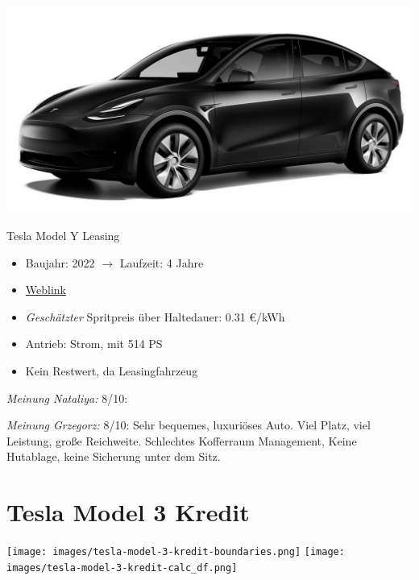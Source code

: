 \documentclass[landscape, DIV=99, 14pt]{scrartcl}
\begin{document}
\pagebreak
\begin{center}
\includegraphics[width=0.9\columnwidth]{cars/tesla-model-y-leasing.jpg}

Tesla Model Y Leasing
\end{center}

\begin{itemize}
    \item Baujahr: 2022 $\rightarrow$ Laufzeit: 4 Jahre
    \item \href{https://www.tesla.com/de_de/modely/design\#overview}{Weblink}
    \item \emph{Gesch\"atzter} Spritpreis \"uber Haltedauer: 0.31 \euro{}/kWh
    \item Antrieb: Strom, mit 514 PS
    \item Kein Restwert, da Leasingfahrzeug
\end{itemize}

\begin{small}
\emph{Meinung Nataliya:} 8/10: 
        
\emph{Meinung Grzegorz:} 8/10: Sehr bequemes, luxuri\"oses Auto. Viel Platz, viel Leistung, gro\ss{}e Reichweite. Schlechtes Kofferraum Management, Keine Hutablage, keine Sicherung unter dem Sitz.
\end{small}

\pagebreak


\twocolumn

\section*{Tesla Model 3 Kredit}
\begin{center}
\texttt{[image: images/tesla-model-3-kredit-boundaries.png]}
\null
\vspace{0.5cm}
\texttt{[image: images/tesla-model-3-kredit-calc\_df.png]}
\end{center}
\end{document}
